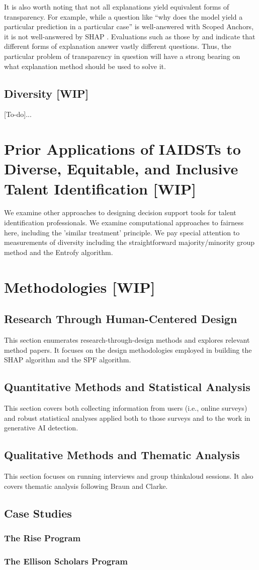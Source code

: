 It is also worth noting that not all explanations yield equivalent forms of transparency. For example, while a question like “why does the model yield a particular prediction in a particular case” is well-answered with Scoped Anchors, it is not well-answered by SHAP \cite{lundberg_unified_2017,ribeiro_anchors_2018}. Evaluations such as those by \textcite{binns_human_2022} and \textcite{rader_explanations_2018} indicate that different forms of explanation answer vastly different questions. Thus, the particular problem of transparency in question will have a strong bearing on what explanation method should be used to solve it.

\subsection{Diversity [WIP]}
[To-do]...

\section{Prior Applications of IAIDSTs to Diverse, Equitable, and Inclusive Talent Identification [WIP]}
We examine other approaches to designing decision support tools for talent identification professionals. We examine computational approaches to fairness here, including the 'similar treatment' principle. We pay special attention to measurements of diversity including the straightforward majority/minority group method and the Entrofy algorithm.

\section{Methodologies [WIP]}
\subsection{Research Through Human-Centered Design}
This section enumerates research-through-design methods and explores relevant method papers. It focuses on the design methodologies employed in building the SHAP algorithm and the SPF algorithm.

\subsection{Quantitative Methods and Statistical Analysis}
This section covers both collecting information from users (i.e., online surveys) and robust statistical analyses applied both to those surveys and to the work in generative AI detection.

\subsection{Qualitative Methods and Thematic Analysis}
This section focuses on running interviews and group thinkaloud sessions. It also covers thematic analysis following Braun and Clarke.

\subsection{Case Studies}
\subsubsection{The Rise Program}
\subsubsection{The Ellison Scholars Program}

